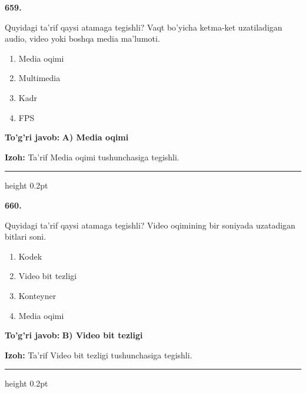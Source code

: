 \documentclass[10pt,a4paper,oneside]{article}
\begin{document}
\noindent\textbf{\color{ink}659.}
\par
Quyidagi ta'rif qaysi atamaga tegishli? Vaqt bo'yicha ketma-ket uzatiladigan audio, video yoki boshqa media ma'lumoti.
\begin{enumerate}[label=\Alph*),leftmargin=9mm]
\item Media oqimi
\item Multimedia
\item Kadr
\item FPS
\end{enumerate}
\begin{tcolorbox}[enhanced,breakable,colback=teal!4,colframe=teal!50!black,boxrule=0.5pt,arc=1.1mm,left=3mm,right=3mm,top=1.7mm,bottom=1.7mm,before skip=2mm,after skip=2mm]
\textbf{\color{teal}To'g'ri javob:} \textbf{A) Media oqimi}
\par\smallskip
\textbf{Izoh:} Ta'rif Media oqimi tushunchasiga tegishli.
\end{tcolorbox}
\vspace{2mm}\hrule height 0.2pt \vspace{3mm}

\noindent\textbf{\color{ink}660.}
\par
Quyidagi ta'rif qaysi atamaga tegishli? Video oqimining bir soniyada uzatadigan bitlari soni.
\begin{enumerate}[label=\Alph*),leftmargin=9mm]
\item Kodek
\item Video bit tezligi
\item Konteyner
\item Media oqimi
\end{enumerate}
\begin{tcolorbox}[enhanced,breakable,colback=teal!4,colframe=teal!50!black,boxrule=0.5pt,arc=1.1mm,left=3mm,right=3mm,top=1.7mm,bottom=1.7mm,before skip=2mm,after skip=2mm]
\textbf{\color{teal}To'g'ri javob:} \textbf{B) Video bit tezligi}
\par\smallskip
\textbf{Izoh:} Ta'rif Video bit tezligi tushunchasiga tegishli.
\end{tcolorbox}
\vspace{2mm}\hrule height 0.2pt \vspace{3mm}
\end{document}
